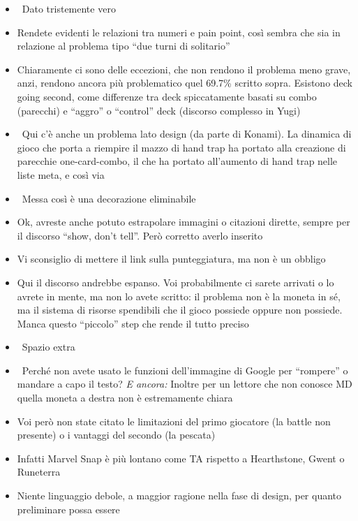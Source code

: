 {\begin{itemize}
  \item {} \rvBene\ Dato tristemente vero
  \item {} Rendete evidenti le relazioni tra numeri e pain point, così sembra che sia in relazione al problema tipo ``due turni di solitario''
  \item {} Chiaramente ci sono delle eccezioni, che non rendono il problema meno grave, anzi, rendono ancora più problematico quel 69.7\% scritto sopra. Esistono deck going second, come differenze tra deck spiccatamente basati su combo (parecchi) e ``aggro'' o ``control'' deck (discorso complesso in Yugi)
  \item \rvVuoto\ Qui c'è anche un problema lato design (da parte di Konami). La dinamica di gioco che porta a riempire il mazzo di hand trap ha portato alla creazione di parecchie one-card-combo, il che ha portato all'aumento di hand trap nelle liste meta, e così via
  \item \rvVuoto\ Messa così è una decorazione eliminabile
  \item {} Ok, avreste anche potuto estrapolare immagini o citazioni dirette, sempre per il discorso ``show, don't tell''. Però corretto averlo inserito
  \item {} Vi sconsiglio di mettere il link sulla punteggiatura, ma non è un obbligo
  \item {} Qui il discorso andrebbe espanso. Voi probabilmente ci sarete arrivati o lo avrete in mente, ma non lo avete scritto: il problema non è la moneta in sé, ma il sistema di risorse spendibili che il gioco possiede oppure non possiede. Manca questo ``piccolo'' step che rende il tutto preciso
  \item \rvVuoto\ Spazio extra
  \item \rvVuoto\ Perché non avete usato le funzioni dell'immagine di Google per ``rompere'' o mandare a capo il testo? \emph{E ancora:} Inoltre per un lettore che non conosce MD quella moneta a destra non è estremamente chiara
  \item {} Voi però non state citato le limitazioni del primo giocatore (la battle non presente) o i vantaggi del secondo (la pescata)
  \item {} Infatti Marvel Snap è più lontano come TA rispetto a Hearthstone, Gwent o Runeterra
  \item {} Niente linguaggio debole, a maggior ragione nella fase di design, per quanto preliminare possa essere

\end{itemize}}
